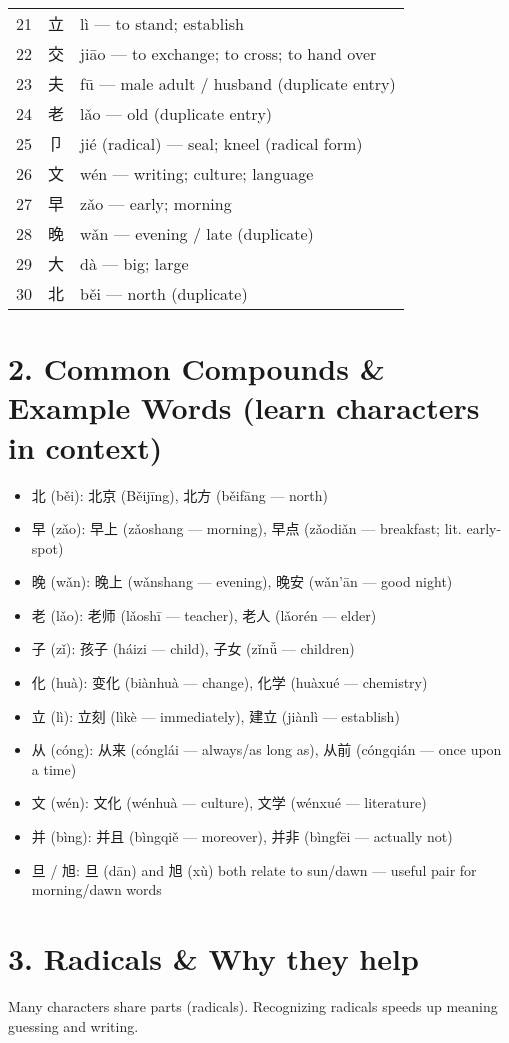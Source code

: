 \documentclass[12pt]{article}
\begin{document}
\begin{CJK}{UTF8}{gbsn}
\begin{longtable}{lll}
21 & 立 & lì — to stand; establish \\
22 & 交 & jiāo — to exchange; to cross; to hand over \\
23 & 夫 & fū — male adult / husband (duplicate entry) \\
24 & 老 & lǎo — old (duplicate entry) \\
25 & 卩 & jié (radical) — seal; kneel (radical form) \\
26 & 文 & wén — writing; culture; language \\
27 & 早 & zǎo — early; morning \\
28 & 晚 & wǎn — evening / late (duplicate) \\
29 & 大 & dà — big; large \\
30 & 北 & běi — north (duplicate) \\
\bottomrule
\end{longtable}

\section*{2. Common Compounds \& Example Words (learn characters in context)}
\begin{itemize}
  \item 北 (běi): 北京 (Běijīng), 北方 (běifāng — north)
  \item 早 (zǎo): 早上 (zǎoshang — morning), 早点 (zǎodiǎn — breakfast; lit. early-spot)
  \item 晚 (wǎn): 晚上 (wǎnshang — evening), 晚安 (wǎn'ān — good night)
  \item 老 (lǎo): 老师 (lǎoshī — teacher), 老人 (lǎorén — elder)
  \item 子 (zǐ): 孩子 (háizi — child), 子女 (zǐnǚ — children)
  \item 化 (huà): 变化 (biànhuà — change), 化学 (huàxué — chemistry)
  \item 立 (lì): 立刻 (lìkè — immediately), 建立 (jiànlì — establish)
  \item 从 (cóng): 从来 (cónglái — always/as long as), 从前 (cóngqián — once upon a time)
  \item 文 (wén): 文化 (wénhuà — culture), 文学 (wénxué — literature)
  \item 并 (bìng): 并且 (bìngqiě — moreover), 并非 (bìngfēi — actually not)
  \item 旦 / 旭: 旦 (dān) and 旭 (xù) both relate to sun/dawn — useful pair for morning/dawn words
\end{itemize}

\section*{3. Radicals \& Why they help}
Many characters share parts (radicals). Recognizing radicals speeds up meaning guessing and writing.


\end{CJK}
\end{document}
